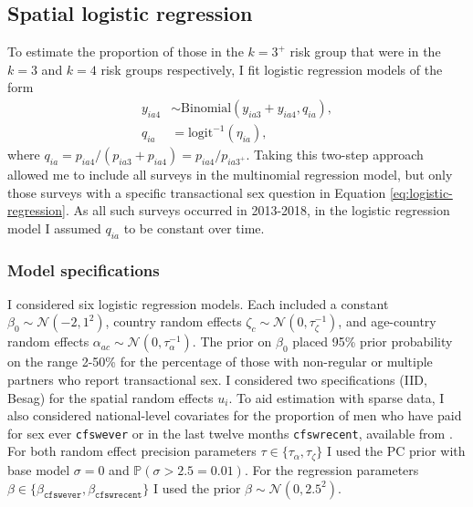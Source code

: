 \documentclass[a4paper, nobind]{templates/ociamthesis}
\begin{document}
\hypertarget{s-logistic}{%
\subsection{Spatial logistic regression}\label{s-logistic}}

To estimate the proportion of those in the \(k = 3^{+}\) risk group that were in the \(k = 3\) and \(k = 4\) risk groups respectively, I fit logistic regression models of the form
\begin{align}
    y_{ia4} &\sim \text{Binomial} \left( y_{ia3} + y_{ia4}, q_{ia} \right), \label{eq:logistic-regression} \\
    q_{ia} &= \text{logit}^{-1} \left( \eta_{ia} \right), 
\end{align}
where \(q_{ia} = p_{ia4} / (p_{ia3} + p_{ia4}) = p_{ia4} / p_{ia{3^+}}\).
Taking this two-step approach allowed me to include all surveys in the multinomial regression model, but only those surveys with a specific transactional sex question in Equation \eqref{eq:logistic-regression}.
As all such surveys occurred in 2013-2018, in the logistic regression model I assumed \(q_{ia}\) to be constant over time.

\hypertarget{model-specifications-1}{%
\subsubsection{Model specifications}\label{model-specifications-1}}

I considered six logistic regression models.
Each included a constant \(\beta_0 \sim \mathcal{N}(-2, 1^2)\), country random effects \(\zeta_{c} \sim \mathcal{N}(0, \tau_\zeta^{-1})\), and age-country random effects \(\alpha_{ac} \sim \mathcal{N}(0, \tau_\alpha^{-1})\).
The prior on \(\beta_0\) placed 95\% prior probability on the range 2-50\% for the percentage of those with non-regular or multiple partners who report transactional sex.
I considered two specifications (IID, Besag) for the spatial random effects \(u_i\).
To aid estimation with sparse data, I also considered national-level covariates for the proportion of men who have paid for sex ever \texttt{cfswever} or in the last twelve months \texttt{cfswrecent}, available from \textcite{hodgins2022population}.
For both random effect precision parameters \(\tau \in \{\tau_\alpha, \tau_\zeta\}\) I used the PC prior with base model \(\sigma = 0\) and \(\mathbb{P}(\sigma > 2.5 = 0.01)\).
For the regression parameters \(\beta \in \{\beta_\texttt{cfswever}, \beta_\texttt{cfswrecent}\}\) I used the prior \(\beta \sim \mathcal{N}(0, 2.5^2)\).
\end{document}
